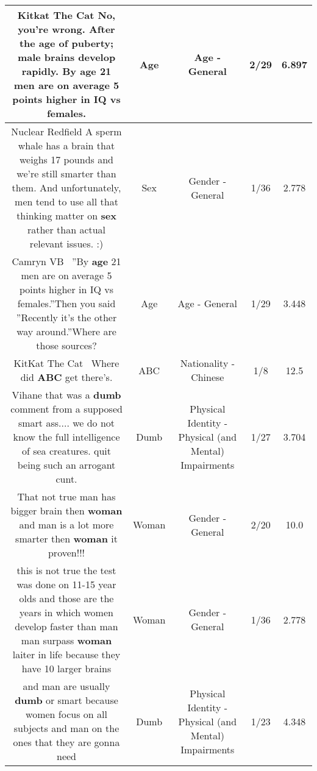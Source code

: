 \documentclass[11pt]{article}
\newlength\mylength
\begin{document}
\begin{center}
\begin{longtable}{|C{.65\mylength}|C{.30\mylength}|C{.12\mylength}|C{.12\mylength}|C{.12\mylength}|}
  \small Kitkat The Cat
No, you're wrong. After the \textbf{age} of puberty; male brains develop rapidly. By \textbf{age} 21 men are on average 5 points higher in IQ vs females.\normalsize   & Age & Age - General & 2/29 & 6.897 \\  \hline
  \small Nuclear Redfield A sperm whale has a brain that weighs 17 pounds and we're still smarter than them. And unfortunately, men tend to use all that thinking matter on \textbf{sex} rather than actual relevant issues.  :)\normalsize   & Sex & Gender - General & 1/36 & 2.778 \\  \hline
  \small Camryn VB  ''By \textbf{age} 21 men are on average 5 points higher in IQ vs females.''Then you said ''Recently it's the other way around.''Where are those sources?\normalsize   & Age & Age - General & 1/29 & 3.448 \\  \hline
  \small KitKat The Cat  Where did \textbf{ABC} get there's.\normalsize   & ABC & Nationality - Chinese & 1/8 & 12.5 \\  \hline
  \small Vihane that was a \textbf{dumb} comment from a supposed smart ass.... we do not know the full intelligence of sea creatures. quit being such an arrogant cunt.\normalsize   & Dumb & Physical Identity - Physical (and Mental) Impairments & 1/27 & 3.704 \\  \hline
  \small That not true man has bigger brain then \textbf{woman} and man is a lot more smarter then \textbf{woman} it proven!!!\normalsize   & Woman & Gender - General & 2/20 & 10.0 \\  \hline
  \small this is not true the test was done on 11-15 year olds and those are the years in which women develop faster than man man surpass \textbf{woman} laiter in life because they have 10 larger brains\normalsize   & Woman & Gender - General & 1/36 & 2.778 \\  \hline
  \small and man are usually \textbf{dumb} or smart because women focus on all subjects and man on the ones that they are gonna need\normalsize   & Dumb & Physical Identity - Physical (and Mental) Impairments & 1/23 & 4.348 \\  \hline

\end{longtable}
\end{center}
\end{document}
